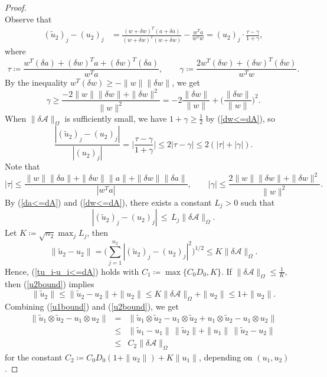 \documentclass{amsart}
\newcommand{\dt}{\delta}
\newcommand{\tu}{\tilde{u}}
\def\gm{\gamma}
\newcommand{\reff}[1]{(\ref{#1})}
\newcommand{\mc}[1]{\mathcal{#1}}
\newcommand{\be}{\begin{equation}}
\newcommand{\ee}{\end{equation}}
\newcommand{\baray}{\begin{array}}
\newcommand{\earay}{\end{array}}
\theoremstyle{definition}
\numberwithin{equation}{section}
\begin{document}
\begin{proof}
\[\]
Observe that
\begin{align*}
(\tu_2)_j - (u_2)_j &= \frac{(w+\dt w)^T(a + \dt a)}{(w + \dt w)^T(w + \dt w)} - \frac{w^Ta}{w^Tw}
= (u_2)_j  \cdot \frac{\tau - \gm}{1 + \gm},
\end{align*}
where
\[
\tau \coloneqq \frac{w^T(\dt a) + (\dt w)^Ta + (\dt w)^T(\dt a)}{w^Ta},
\qquad \gm \coloneqq \frac{2w^T(\dt w) + (\dt w)^T (\dt w)}{w^Tw}.
\]
By the inequality $w^T(\dt w) \ge - \|w\| \|\dt w\|$, we get
\[
\gm \ge \frac{ -2 \|w\| \|\dt w\| + \|\dt w\|^2 }{\|w\|^2}
= -2\frac{\|\dt w\|}{\|w\|} + \Big(\frac{\|\dt w\|}{\|w\|}\Big)^2.
\]
When $\|\dt \mc{A}\|_{\Omega}$ is sufficiently small, 
we have $1+\gm \ge \frac{1}{2}$ by \reff{dw<=dA}, so
\[
\frac{|(\tu_2)_j - (u_2)_j|}{|(u_2)_j|} = \Big| \frac{\tau - \gm}{1+\gm} \Big| 
\le 2|\tau - \gm| \le 2(|\tau| + |\gm|).
\]
Note that 
\[
|\tau| \le \frac{\|w\|\|\dt a\| + \|\dt w\| \|a\| + \|\dt w\| \|\dt a\|}{|w^Ta|},
\qquad |\gm| \le \frac{2 \|w\| \|\dt w\| + \|\dt w\|^2}{\|w\|^2}.
\]
By \reff{da<=dA} and \reff{dw<=dA}, there exists a constant $L_j > 0$ such that
\[
|(\tu_2)_j - (u_2)_j| \,\le\, L_j \|\dt \mc{A}\|_{\Omega}.
\]
Let $K \coloneqq \sqrt{n_2} \max_j L_j$, then
\be\label{u2bound}
\|\tu_2 - u_2\| = \Big( \sum_{j = 1}^{n_2} |(\tu_2)_j - (u_2)_j|^2 \Big)^{1/2} \le K \|\dt \mc{A}\|_{\Omega}.
\ee
Hence, \reff{tu_i-u_i<=dA} holds with $C_1 \coloneqq \max\{ C_0D_0, K \}$.
If $\|\dt \mc{A}\|_{\Omega} \le \frac{1}{K}$, then \reff{u2bound} implies
\[
\|\tu_2\| \le \| \tu_2 - u_2 \| + \|u_2\| \le K \|\dt \mc{A}\|_{\Omega} + \|u_2\| \le 1 +  \|u_2\|.
\]
Combining \reff{u1bound} and \reff{u2bound}, we get
\be\label{base}
\baray{rcl}
\|\tu_1\otimes \tu_2 - u_1 \otimes u_2\|
&=& \|\tu_1 \otimes \tu_2 - u_1 \otimes \tu_2 + u_1 \otimes \tu_2 -u_1\otimes u_2\| \\
&\le& \|\tu_1-u_1\|\,\|\tu_2\|+\|u_1\|\,\|\tu_2-u_2\| \\
&\le& C_2\|\dt\mc{A}\|_\Omega
\earay
\ee
for the constant $C_2 \coloneqq C_0D_0(1+\|u_2\|)+ K\|u_1\|$, depending on $(u_1, u_2)$.






\end{proof}
\end{document}
